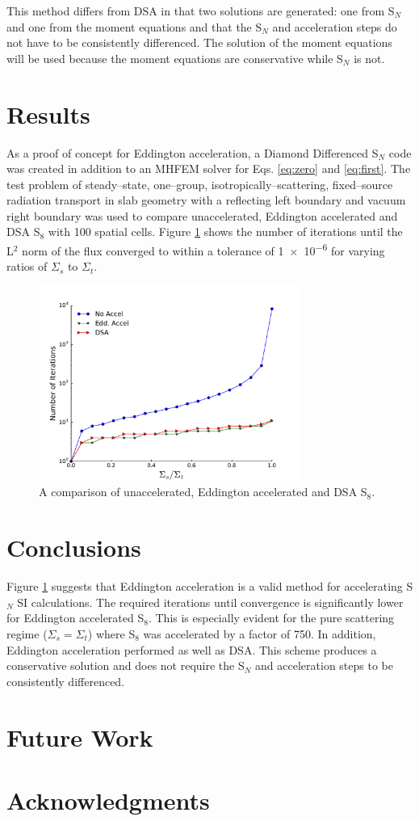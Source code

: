 \documentclass{anstrans}
\newcommand{\SN}{S$_N$\xspace}
\begin{document}
	This method differs from DSA in that two solutions are generated: one from \SN and one from the moment equations and that the \SN and acceleration steps do not have to be consistently differenced. The solution of the moment equations will be used because the moment equations are conservative while \SN is not. 
\section{Results}
	As a proof of concept for Eddington acceleration, a Diamond Differenced \SN code was created in addition to an MHFEM solver for Eqs. \ref{eq:zero} and \ref{eq:first}. The test problem of steady--state, one--group, isotropically--scattering, fixed--source radiation transport in slab geometry with a reflecting left boundary and vacuum right boundary was used to compare unaccelerated, Eddington accelerated and DSA S$_8$ with 100 spatial cells. Figure \ref{fig:comparison} shows the number of iterations until the L$^2$ norm of the flux converged to within a tolerance of \num{1e-6} for varying ratios of $\Sigma_s$ to $\Sigma_t$. 


	\begin{figure}[ht] %
	  \centering
	  \includegraphics[width=8.5cm]{accel.pdf}
	  \caption{A comparison of unaccelerated, Eddington accelerated and DSA S$_8$. }
	  \label{fig:comparison}
	\end{figure}

\section{Conclusions}
	Figure \ref{fig:comparison} suggests that Eddington acceleration is a valid method for accelerating \SN SI calculations. The required iterations until convergence is significantly lower for Eddington accelerated S$_8$. This is especially evident for the pure scattering regime ($\Sigma_s = \Sigma_t$) where S$_8$ was accelerated by a factor of 750. In addition, Eddington acceleration performed as well as DSA. This scheme produces a conservative solution and does not require the \SN and acceleration steps to be consistently differenced. 

\section{Future Work} 
	

\section{Acknowledgments}



\end{document}
